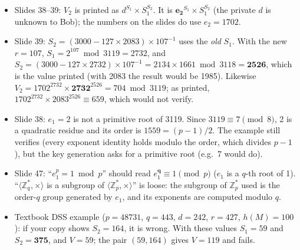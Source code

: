 \begin{fixbox}
\begin{itemize}[leftmargin=1.2em,itemsep=0pt]
  \item Slides 38--39: $V_2$ is printed as $d^{S_1} \times S_1^{S_2}$. It is $\boldsymbol{e_2}^{S_1} \times S_1^{S_2}$ (the private $d$ is unknown to Bob); the numbers on the slides do use $e_2 = 1702$.
  \item Slide 39: $S_2 = (3000 - 127 \times 2083) \times 107^{-1}$ uses the \emph{old} $S_1$. With the new $r = 107$, $S_1 = 2^{107} \bmod 3119 = 2732$, and $S_2 = (3000 - 127 \times 2732) \times 107^{-1} = 2134 \times 1661 \bmod 3118 = \mathbf{2526}$, which is the value printed (with 2083 the result would be 1985). Likewise $V_2 = 1702^{2732} \times \mathbf{2732}^{2526} = 704 \bmod 3119$; as printed, $1702^{2732} \times 2083^{2526} \equiv 659$, which would not verify.
  \item Slide 38: $e_1 = 2$ is not a primitive root of 3119. Since $3119 \equiv 7 \pmod 8$, 2 is a quadratic residue and its order is $1559 = (p-1)/2$. The example still verifies (every exponent identity holds modulo the order, which divides $p - 1$), but the key generation asks for a primitive root (e.g.\ 7 would do).
  \item Slide 47: ``$e_1^p = 1 \bmod p$'' should read $e_1^{\boldsymbol{q}} \equiv 1 \pmod p$ ($e_1$ is a $q$-th root of 1). ``$\langle \mathbb{Z}_q^*, \times\rangle$ is a subgroup of $\langle \mathbb{Z}_p^*, \times\rangle$'' is loose: the subgroup of $\mathbb{Z}_p^*$ used is the order-$q$ group generated by $e_1$, and its exponents are computed modulo $q$.
  \item Textbook DSS example ($p = 48731$, $q = 443$, $d = 242$, $r = 427$, $h(M) = 100$): if your copy shows $S_2 = 164$, it is wrong. With these values $S_1 = 59$ and $S_2 = \mathbf{375}$, and $V = 59$; the pair $(59, 164)$ gives $V = 119$ and fails.
\end{itemize}
\end{fixbox}
